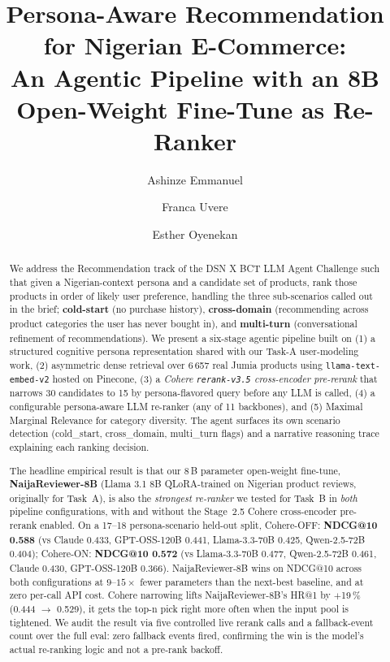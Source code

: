 \documentclass[sigconf,nonacm,balance]{acmart}
\title{Persona-Aware Recommendation for Nigerian E-Commerce:\\
       An Agentic Pipeline with an 8B Open-Weight Fine-Tune as Re-Ranker}
\author{Ashinze Emmanuel}
\affiliation{\institution{International University of Applied Sciences}\country{Germany}}
\author{Franca Uvere}
\affiliation{\institution{University of Lagos}\country{Nigeria}}
\author{Esther Oyenekan}
\affiliation{\institution{MIVA Open University}\country{Nigeria}}
\begin{document}
\begin{abstract}
We address the Recommendation track of the DSN X BCT LLM Agent Challenge such that
given a Nigerian-context persona and a candidate set of products, rank
those products in order of likely user preference, handling the three
sub-scenarios called out in the brief; \textbf{cold-start}
(no purchase history), \textbf{cross-domain} (recommending across product
categories the user has never bought in), and \textbf{multi-turn}
(conversational refinement of recommendations). We present a six-stage
agentic pipeline built on (1) a structured cognitive persona
representation shared with our Task-A user-modeling work,
(2) asymmetric dense retrieval over 6\,657 real Jumia products using
\texttt{llama-text-embed-v2} hosted on Pinecone, (3) a
\emph{Cohere \texttt{rerank-v3.5} cross-encoder pre-rerank} that narrows
30 candidates to 15 by persona-flavored query before any LLM is called,
(4) a configurable persona-aware LLM re-ranker (any of 11 backbones),
and (5) Maximal Marginal Relevance for category diversity. The agent surfaces its own scenario detection
(\textsf{cold\_start}, \textsf{cross\_domain}, \textsf{multi\_turn} flags)
and a narrative reasoning trace explaining each ranking decision.

The headline empirical result is that our 8\,B parameter open-weight
fine-tune, \textbf{NaijaReviewer-8B} (Llama 3.1 8B QLoRA-trained on
Nigerian product reviews, originally for Task~A), is also the
\emph{strongest re-ranker} we tested for Task~B in \emph{both}
pipeline configurations,  with and without the Stage~2.5 Cohere
cross-encoder pre-rerank enabled. On a 17--18 persona-scenario
held-out split, Cohere-OFF: \textbf{NDCG@10 0.588} (vs Claude 0.433,
GPT-OSS-120B 0.441, Llama-3.3-70B 0.425, Qwen-2.5-72B 0.404);
Cohere-ON: \textbf{NDCG@10 0.572} (vs Llama-3.3-70B 0.477,
Qwen-2.5-72B 0.461, Claude 0.430, GPT-OSS-120B 0.366). NaijaReviewer-8B
wins on NDCG@10 across both configurations at $9$--$15\times$ fewer
parameters than the next-best baseline, and at zero per-call API cost.
Cohere narrowing lifts NaijaReviewer-8B's HR@1 by $+$19\,\% (0.444
$\to$ 0.529), it gets the top-n pick right more often when the
input pool is tightened. We audit the result via five controlled
live rerank calls and a fallback-event count over the full eval: zero
fallback events fired, confirming the win is the model's actual
re-ranking logic and not a pre-rank backoff.
\end{abstract}

\maketitle
\end{document}
